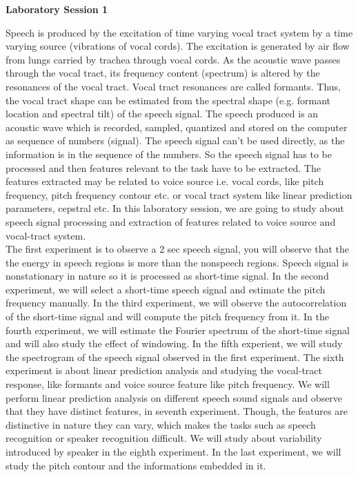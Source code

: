 \setlength{\topmargin}{0.25cm}
\setlength{\topskip}{0.0cm}
\setlength{\textwidth}{6.5in}
\setlength{\textheight}{8in}
\setlength{\oddsidemargin}{1pt}
\setlength{\evensidemargin}{1pt}
\setlength{\parskip}{1ex plus0.5ex minus0.2ex}
\sloppy
\setlength{\parindent}{1cm}


\begin{center}
	{\bf Laboratory Session 1}
\end{center}
Speech is produced by the excitation of time varying
vocal tract system by a time varying source (vibrations of vocal
cords). The excitation is generated by air flow from lungs carried by trachea
through vocal cords. As the acoustic wave passes through the vocal
tract, its frequency content (spectrum) is altered by the
resonances of the vocal tract. Vocal tract resonances are called
formants. Thus, the vocal tract shape can be estimated from the
spectral shape (e.g. formant location and spectral tilt) of the speech
signal. The speech produced is an acoustic wave which is recorded,
sampled, quantized and stored on the computer as sequence of numbers
(signal). The speech signal can't be used directly, as the information
is in the sequence of the numbers. So the speech signal has to be
processed and then features relevant to the task have to be
extracted. The features extracted may be related to voice source
i.e. vocal cords, like pitch frequency, pitch frequency contour
etc. or vocal tract system like
linear prediction parameters, cepstral etc. In this
laboratory session, we are going to study about speech signal processing
and extraction of features related to voice source and vocal-tract
system.\\[2ex]
The first experiment is to observe a 2 sec speech signal, you will
observe that the the energy in speech regions is more than the
nonspeech regions. Speech signal is nonstationary in nature so it is
processed as short-time signal. In the second experiment, we will
select a short-time speech signal and estimate the pitch frequency
manually. In the
third experiment, we will observe the autocorrelation of the
short-time signal and will compute the pitch frequency from it. In the
fourth experiment, we will estimate the Fourier spectrum of the
short-time signal and will also study the effect of windowing. In the
fifth experient, we will
study the spectrogram of the speech signal observed in the first
experiment. The sixth experiment is about
linear prediction analysis and studying the vocal-tract response, like
formants and voice source feature like pitch frequency. We will perform linear
prediction analysis on different speech sound signals and observe that
they have distinct features, in seventh experiment. Though, the features are distinctive in
nature they can vary, which makes the tasks such as speech recognition
or speaker recognition difficult. We will study about variability
introduced by speaker in the eighth experiment. In the last
experiment, we will study the pitch contour and the informations
embedded in it.\\[2ex]

